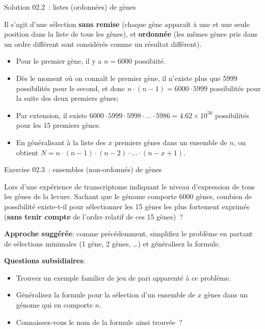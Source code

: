 \documentclass[ignorenonframetext,]{beamer}
\providecommand{\tightlist}{%
  \setlength{\itemsep}{0pt}\setlength{\parskip}{0pt}}
\begin{document}
\begin{frame}{Solution 02.2~: listes (ordonnées) de gènes}
\protect\hypertarget{solution-02.2-listes-ordonnees-de-genes}{}

Il s'agit d'une sélection \textbf{sans remise} (chaque gène apparaît à
une et une seule position dans la liste de tous les gènes), et
\textbf{ordonnée} (les mêmes gènes pris dans un ordre différent sont
considérés comme un résultat différent).

\begin{itemize}
\tightlist
\item
  Pour le premier gène, il y a \(n=6000\) possibiité.
\item
  Dès le moment où on connaît le premier gène, il n'existe plus que 5999
  possibilités pour le second, et donc
  \(n \cdot (n-1) = 6000 \cdot 5999\) possibilités pour la suite des
  deux premiers gènes;
\item
  Par extension, il existe
  \(6000 \cdot 5999 \cdot 5998 \cdot \ldots \cdot 5986 = \ensuremath{4.62\times 10^{56}}\)
  possibilités pour les 15 premiers gènes.
\item
  En généralisant à la liste des \(x\) premiers gènes dans un ensemble
  de \(n\), on obtient
  \(N = n \cdot (n-1) \cdot (n-2) \cdot ... \cdot (n-x+1)\).
\end{itemize}

\end{frame}

\begin{frame}{Exercise 02.3~: ensembles (non-ordonnés) de gènes}
\protect\hypertarget{exercise-02.3-ensembles-non-ordonnes-de-genes}{}

Lors d'une expérience de transcriptome indiquant le niveau d'expression
de tous les gènes de la levure. Sachant que le génome comporte 6000
gènes, combien de possibilité existe-t-il pour sélectionner les 15 gènes
les plus fortement exprimés (\textbf{sans tenir compte} de l'ordre
relatif de ces 15 gènes)~?

\textbf{Approche suggérée}: comme précédemment, simplifiez le problème
en partant de sélections minimales (1 gène, 2 gènes, \ldots{}) et
généralisez la formule.

\textbf{Questions subsidiaires}:

\begin{itemize}
\tightlist
\item
  Trouvez un exemple familier de jeu de pari apparenté à ce problème.
\item
  Généralisez la formule pour la sélection d'un ensemble de \(x\) gènes
  dans un génome qui en comporte \(n\).
\item
  Connaissez-vous le nom de la formule ainsi trouvée~?
\end{itemize}

\end{frame}
\end{document}
